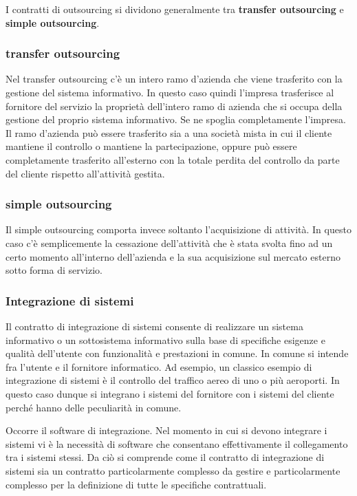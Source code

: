 I contratti di outsourcing si dividono generalmente tra \textbf{transfer outsourcing} e \textbf{simple outsourcing}. 

\subsubsection{transfer outsourcing}
Nel  transfer outsourcing c'è un intero ramo d'azienda che viene trasferito con la gestione del sistema informativo. In questo caso quindi l'impresa trasferisce al fornitore del servizio la proprietà dell'intero ramo di azienda che si occupa della gestione del proprio sistema informativo. Se ne spoglia completamente l'impresa. Il ramo d'azienda può essere trasferito sia a una società mista in cui il cliente mantiene il controllo o mantiene la partecipazione, oppure può essere completamente trasferito all'esterno con la totale perdita del controllo da parte del cliente rispetto all'attività gestita. 

\subsubsection{simple outsourcing}
Il simple outsourcing comporta invece soltanto l'acquisizione di attività. In questo caso c'è semplicemente la cessazione dell'attività che è stata svolta fino ad un certo momento all'interno dell'azienda e la sua acquisizione sul mercato esterno sotto forma di servizio. 

\subsubsection{Integrazione di sistemi} 

Il contratto di integrazione di sistemi consente di realizzare un sistema informativo o un sottosistema informativo sulla base di specifiche esigenze e qualità dell'utente con funzionalità e prestazioni in comune. In comune si intende fra l'utente e il fornitore informatico. Ad esempio, un classico esempio di integrazione di sistemi è il controllo del traffico aereo di uno o più aeroporti. In questo caso dunque si integrano i sistemi del fornitore con i sistemi del cliente perché hanno delle peculiarità in comune. 

Occorre il software di integrazione. Nel momento in cui si devono integrare i sistemi vi è la necessità di software che consentano effettivamente il collegamento tra i sistemi stessi. Da ciò si comprende come il contratto di integrazione di sistemi sia un contratto particolarmente complesso da gestire e particolarmente complesso per la definizione di tutte le specifiche contrattuali. 

